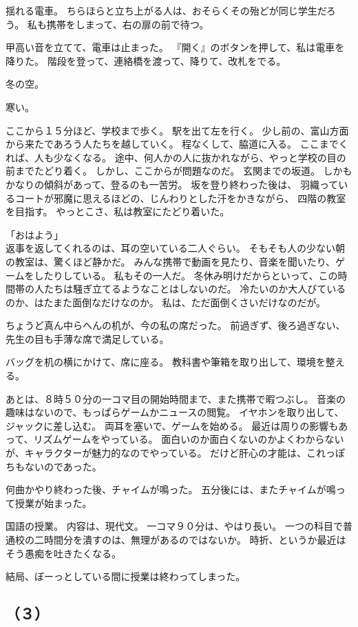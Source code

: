 \documentclass[../IHMain]{subfiles}
\begin{document}
揺れる電車。
ちらほらと立ち上がる人は、おそらくその殆どが同じ学生だろう。
私も携帯をしまって、右の扉の前で待つ。

甲高い音を立てて、電車は止まった。
『開く』のボタンを押して、私は電車を降りた。
階段を登って、連絡橋を渡って、降りて、改札をでる。

冬の空。

寒い。

ここから１５分ほど、学校まで歩く。
駅を出て左を行く。
少し前の、富山方面から来たであろう人たちを越していく。
程なくして、脇道に入る。
ここまでくれば、人も少なくなる。
途中、何人かの人に抜かれながら、やっと学校の目の前までたどり着く。
しかし、ここからが問題なのだ。
玄関までの坂道。
しかもかなりの傾斜があって、登るのも一苦労。
坂を登り終わった後は、
羽織っているコートが邪魔に思えるほどの、じんわりとした汗をかきながら、
四階の教室を目指す。
やっとこさ、私は教室にたどり着いた。

「おはよう」\\
返事を返してくれるのは、耳の空いている二人ぐらい。
そもそも人の少ない朝の教室は、驚くほど静かだ。
みんな携帯で動画を見たり、音楽を聞いたり、ゲームをしたりしている。
私もその一人だ。
冬休み明けだからといって、この時間帯の人たちは騒ぎ立てるようなことはしないのだ。
冷たいのか大人びているのか、はたまた面倒なだけなのか。
私は、ただ面倒くさいだけなのだが。

ちょうど真ん中らへんの机が、今の私の席だった。
前過ぎず、後ろ過ぎない、先生の目も手薄な席で満足している。

バッグを机の横にかけて、席に座る。
教科書や筆箱を取り出して、環境を整える。

あとは、８時５０分の一コマ目の開始時間まで、また携帯で暇つぶし。
音楽の趣味はないので、もっぱらゲームかニュースの閲覧。
イヤホンを取り出して、ジャックに差し込む。
両耳を塞いで、ゲームを始める。
最近は周りの影響もあって、リズムゲームをやっている。
面白いのか面白くないのかよくわからないが、キャラクターが魅力的なのでやっている。
だけど肝心の才能は、これっぽちもないのであった。

何曲かやり終わった後、チャイムが鳴った。
五分後には、またチャイムが鳴って授業が始まった。

国語の授業。
内容は、現代文。
一コマ９０分は、やはり長い。
一つの科目で普通校の二時間分を潰すのは、無理があるのではないか。
時折、というか最近はそう愚痴を吐きたくなる。

結局、ぼーっとしている間に授業は終わってしまった。

\subsection*{\gt（３）}
\end{document}
